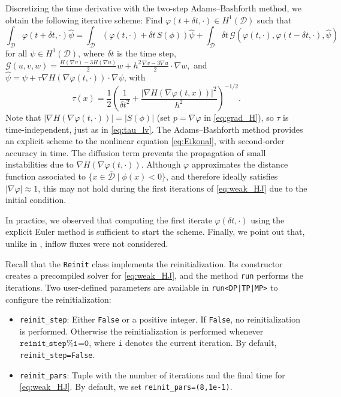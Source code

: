 \documentclass[preprint,9pt]{elsarticle}
\begin{document}
Discretizing the time derivative with the two-step Adams--Bashforth method,
we obtain the following iterative scheme:
Find $\varphi(t + \delta t, \cdot) \in H^1(\mathcal{D})$ such that
\begin{equation}\label{eq:weak_HJ}
	\int_{\mathcal{D}}  \varphi(t + \delta t, \cdot) \hat{\psi} =
	\int_{\mathcal{D}} (\varphi(t, \cdot) + {\delta t} \, S(\phi)) \hat{\psi}
	+\int_{\mathcal{D}} {\delta t}\,
	\mathcal{G}(\varphi(t, \cdot), \varphi(t - \delta t, \cdot), \hat{\psi})
\end{equation}
for all $\psi\in H^1(\mathcal{D})$, where $\delta t$ is the time step,
$
	\mathcal{G}(u, v, w) = \tfrac{H(\nabla v)-3H(\nabla u)}{2} w +
	h^2 \tfrac{\nabla v - 3\nabla u}{2} \cdot \nabla w,
$
and $\hat{\psi}=\psi+\tau\nabla H(\nabla\varphi(t,\cdot))\cdot\nabla\psi$, with 
\begin{equation}
	\tau(x) = \frac{1}{2}\left(\frac{1}{\delta t^2}  +
	\frac{|\nabla H(\nabla \varphi(t, x))|^2}{h^2}\right)^{-1/2}.
\end{equation}
Note that $|\nabla H(\nabla \varphi(t, \cdot))|=|S(\phi)|$
(set $p=\nabla\varphi$ in \eqref{eq:grad_H}),
so $\tau$ is time-independent, just as in \eqref{eq:tau_lv}.
The Adams--Bashforth method provides an explicit scheme
to the nonlinear equation \eqref{eq:Eikonal},
with second-order accuracy in time.
The diffusion term prevents the propagation of
small instabilities due to $\nabla H(\nabla \varphi (t, \cdot))$.
Although $\varphi$ approximates the distance function
associated to $\{x\in\overline{\mathcal{D}} \mid \phi(x)<0\}$, and
therefore ideally satisfies $|\nabla\varphi| \approx 1$,
this may not hold during the first iterations of \eqref{eq:weak_HJ}
due to the initial condition.

In practice, we observed that computing
the first iterate $\varphi(\delta t, \cdot)$
using the explicit Euler method is sufficient to start the scheme.
Finally, we point out that, unlike in \cite{MR1640142},
inflow fluxes were not considered.

Recall that the \texttt{Reinit} class implements the reinitialization.
Its constructor creates a precompiled solver for \eqref{eq:weak_HJ},
and the method \texttt{run} performs the iterations.
Two user-defined parameters are available in \texttt{run<DP|TP|MP>}
to configure the reinitialization:
\begin{itemize}
	\item \texttt{reinit\_step}:
	Either \texttt{False} or a positive integer.
	If \texttt{False}, no reinitialization is performed. Otherwise
	the reinitialization is performed whenever $\texttt{reinit\_step\%i=0}$, where
	\texttt{i} denotes the current iteration. By default, \texttt{reinit\_step=False}.
	\item \texttt{reinit\_pars}:
	Tuple with the number of iterations and the final time for \eqref{eq:weak_HJ}.
	By default, we set \texttt{reinit\_pars=(8,1e-1)}.
\end{itemize}
\end{document}
